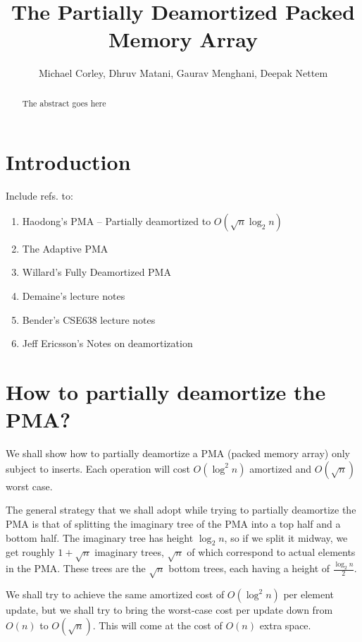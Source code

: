 \documentclass{article}
\title{The Partially Deamortized Packed Memory Array}
\author{Michael Corley, Dhruv Matani, Gaurav Menghani, Deepak Nettem}
\begin{document}
\maketitle

\begin{abstract}
  The abstract goes here
\end{abstract}

\clearpage

\section{Introduction}
Include refs. to:
\begin{enumerate}
\item Haodong's PMA -- Partially deamortized to $O(\sqrt{n}\log_2{n})$
\item The Adaptive PMA
\item Willard's Fully Deamortized PMA
\item Demaine's lecture notes
\item Bender's CSE638 lecture notes
\item Jeff Ericsson's Notes on deamortization
\end{enumerate}

\section{How to partially deamortize the PMA?}

We shall show how to partially deamortize a PMA (packed memory array)
only subject to inserts. Each operation will cost $O(\log^2{n})$
amortized and $O(\sqrt{n})$ worst case.

The general strategy that we shall adopt while trying to partially
deamortize the PMA is that of splitting the imaginary tree of the PMA
into a top half and a bottom half. The imaginary tree has height
$\log_2{n}$, so if we split it midway, we get roughly $1 +
\sqrt{n}$ imaginary trees, $\sqrt{n}$ of which correspond to actual
elements in the PMA. These trees are the $\sqrt{n}$ bottom trees, each
having a height of $\frac{\log_2{n}}{2}$.

We shall try to achieve the same amortized cost of $O(\log^2{n})$ per
element update, but we shall try to bring the worst-case cost per
update down from $O(n)$ to $O(\sqrt{n})$. This will come at the cost
of $O(n)$ extra space.
\end{document}
